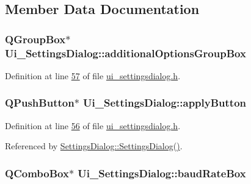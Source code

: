 \subsection{Member Data Documentation}
\hypertarget{a00082_a996d0cf4818dae895375cb43b996e0dc}{
\subsubsection[{additional\+Options\+Group\+Box}]{\setlength{\rightskip}{0pt plus 5cm}Q\+Group\+Box$\ast$ Ui\+\_\+\+Settings\+Dialog\+::additional\+Options\+Group\+Box}}\label{a00082_a996d0cf4818dae895375cb43b996e0dc}


Definition at line \hyperlink{a00141_source_l00057}{57} of file \hyperlink{a00141_source}{ui\+\_\+settingsdialog.\+h}.

\hypertarget{a00082_adc885543c05d0026019ec678b4d08c5c}{
\subsubsection[{apply\+Button}]{\setlength{\rightskip}{0pt plus 5cm}Q\+Push\+Button$\ast$ Ui\+\_\+\+Settings\+Dialog\+::apply\+Button}}\label{a00082_adc885543c05d0026019ec678b4d08c5c}


Definition at line \hyperlink{a00141_source_l00056}{56} of file \hyperlink{a00141_source}{ui\+\_\+settingsdialog.\+h}.



Referenced by \hyperlink{a00131_source_l00052}{Settings\+Dialog\+::\+Settings\+Dialog()}.

\hypertarget{a00082_a766a61db4a8c72219543f7c096ae5601}{
\subsubsection[{baud\+Rate\+Box}]{\setlength{\rightskip}{0pt plus 5cm}Q\+Combo\+Box$\ast$ Ui\+\_\+\+Settings\+Dialog\+::baud\+Rate\+Box}}\label{a00082_a766a61db4a8c72219543f7c096ae5601}


